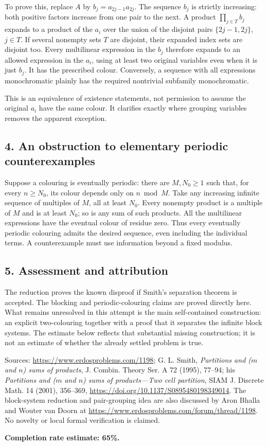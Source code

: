 To prove this, replace $A$ by $b_j=a_{2j-1}a_{2j}$. The sequence $b_j$ is strictly increasing: both positive factors increase from one pair to the next. A product $\prod_{j\in T}b_j$ expands to a product of the $a_i$ over the union of the disjoint pairs $\{2j-1,2j\}$, $j\in T$. If several nonempty sets $T$ are disjoint, their expanded index sets are disjoint too. Every multilinear expression in the $b_j$ therefore expands to an allowed expression in the $a_i$, using at least two original variables even when it is just $b_j$. It has the prescribed colour. Conversely, a sequence with all expressions monochromatic plainly has the required nontrivial subfamily monochromatic.

This is an equivalence of existence statements, not permission to assume the original $a_i$ have the same colour. It clarifies exactly where grouping variables removes the apparent exception.

\subsection*{4. An obstruction to elementary periodic counterexamples}
Suppose a colouring is eventually periodic: there are $M,N_0\ge1$ such that, for every $n\ge N_0$, its colour depends only on $n\bmod M$. Take any increasing infinite sequence of multiples of $M$, all at least $N_0$. Every nonempty product is a multiple of $M$ and is at least $N_0$; so is any sum of such products. All the multilinear expressions have the eventual colour of residue zero. Thus every eventually periodic colouring admits the desired sequence, even including the individual terms. A counterexample must use information beyond a fixed modulus.

\subsection*{5. Assessment and attribution}
The reduction proves the known disproof if Smith's separation theorem is accepted. The blocking and periodic-colouring claims are proved directly here. What remains unresolved in this attempt is the main self-contained construction: an explicit two-colouring together with a proof that it separates the infinite block systems. The estimate below reflects that substantial missing construction; it is not an estimate of whether the already settled problem is true.

Sources: \url{https://www.erdosproblems.com/1198}; G. L. Smith, \emph{Partitions and ($m$ and $n$) sums of products}, J. Combin. Theory Ser. A 72 (1995), 77--94; his \emph{Partitions and ($m$ and $n$) sums of products---Two cell partition}, SIAM J. Discrete Math. 14 (2001), 356--369, \url{https://doi.org/10.1137/S0895480198349014}. The block-system reduction and pair-grouping idea are also discussed by Aron Bhalla and Wouter van Doorn at \url{https://www.erdosproblems.com/forum/thread/1198}. No novelty or local formal verification is claimed.

\textbf{Completion rate estimate: 65\%.}
